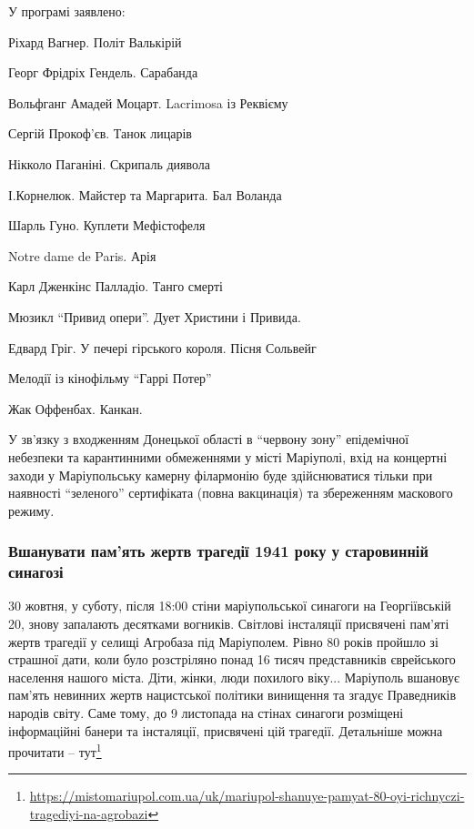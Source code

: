 У програмі заявлено:

Ріхард Вагнер. Політ Валькірій\par
Георг Фрідріх Гендель. Сарабанда\par
Вольфганг Амадей Моцарт. Lacrimosa із Реквієму\par
Сергій Прокоф'єв. Танок лицарів\par
Нікколо Паганіні. Скрипаль диявола\par
І.Корнелюк. Майстер та Маргарита. Бал Воланда\par
Шарль Гуно. Куплети Мефістофеля\par
Notre dame de Paris. Арія\par
Карл Дженкінс Палладіо. Танго смерті\par
Мюзикл \enquote{Привид опери}. Дует Христини і Привида.\par
Едвард Гріг. У печері гірського короля. Пісня Сольвейг\par
Мелодії із кінофільму \enquote{Гаррі Потер}\par
Жак Оффенбах. Канкан.\par

У зв'язку з входженням Донецької області в \enquote{червону зону} епідемічної небезпеки
та карантинними обмеженнями у місті Маріуполі, вхід на концертні заходи у
Маріупольську камерну філармонію буде здійснюватися тільки при наявності
\enquote{зеленого} сертифіката (повна вакцинація) та збереженням маскового режиму.

\subsubsection{Вшанувати пам'ять жертв трагедії 1941 року у старовинній синагозі}


30 жовтня, у суботу, після 18:00 стіни маріупольської синагоги на Георгіївській
20, знову запалають десятками вогників. Світлові інсталяції присвячені пам'яті
жертв трагедії у селищі Агробаза під Маріуполем. Рівно 80 років пройшло зі
страшної дати, коли було розстріляно понад 16 тисяч представників єврейського
населення нашого міста. Діти, жінки, люди похилого віку... Маріуполь вшановує
пам'ять невинних жертв нацистської політики винищення та згадує Праведників
народів світу. Саме тому, до 9 листопада на стінах синагоги розміщені
інформаційні банери та інсталяції, присвячені цій трагедії. Детальніше можна
прочитати – тут\footnote{\url{https://mistomariupol.com.ua/uk/mariupol-shanuye-pamyat-80-oyi-richnyczi-tragediyi-na-agrobazi}}


